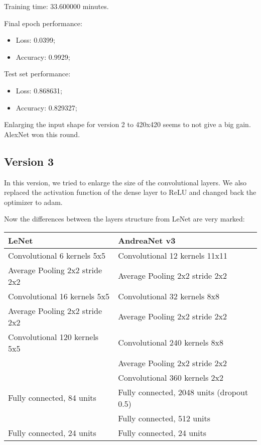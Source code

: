 \documentclass[paper=a4, fontsize=11pt]{scrartcl} %
\numberwithin{equation}{section} %
\numberwithin{figure}{section} %
\numberwithin{table}{section} %
\begin{document}
Training time: 33.600000 minutes.

Final epoch performance:
\begin{itemize}
    \item Loss: 0.0399;
    \item Accuracy: 0.9929;
\end{itemize}

Test set performance:
\begin{itemize}
    \item Loss: 0.868631;
    \item Accuracy: 0.829327;
\end{itemize}

Enlarging the input shape for version 2 to 420x420 seems to not give a big gain. AlexNet won this round.

\subsection*{Version 3}

In this version, we tried to enlarge the size of the convolutional layers.
We also replaced the activation function of the dense layer to ReLU and changed back the optimizer to adam.

Now the differences between the layers structure from LeNet are very marked:

\bigskip
\begin{tabular}{ | l | l | }
    \hline
    \textbf{LeNet} & \textbf{AndreaNet v3} \\ \hline
    Convolutional 6 kernels 5x5 & Convolutional 12 kernels 11x11 \\ \hline 
    Average Pooling 2x2 stride 2x2 & Average Pooling 2x2 stride 2x2 \\ \hline 
    Convolutional 16 kernels 5x5 & Convolutional 32 kernels 8x8 \\ \hline 
    Average Pooling 2x2 stride 2x2 & Average Pooling 2x2 stride 2x2 \\ \hline
    Convolutional 120 kernels 5x5 & Convolutional 240 kernels 8x8 \\ \hline
    & Average Pooling 2x2 stride 2x2 \\ \hline     
    & Convolutional 360 kernels 2x2 \\ \hline 
    Fully connected, 84 units & Fully connected, 2048 units (dropout 0.5) \\ \hline 
    & Fully connected, 512 units \\ \hline 
    Fully connected, 24 units & Fully connected, 24 units \\ \hline 
\end{tabular}
\bigskip
\end{document}

